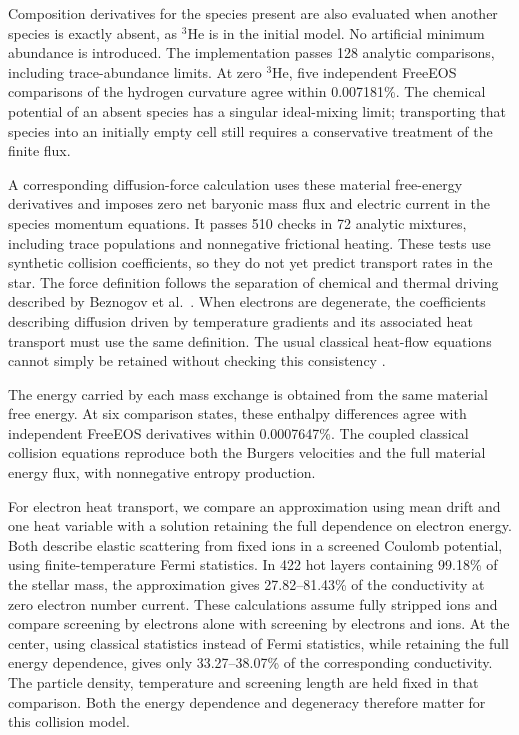 \documentclass[11pt,letterpaper]{article}
\begin{document}
Composition derivatives for the species present are also evaluated when
another species is exactly absent, as $^3$He is in the initial model.
No artificial minimum abundance is introduced. The implementation passes
128 analytic comparisons, including trace-abundance limits. At zero $^3$He,
five independent FreeEOS comparisons of the hydrogen curvature agree within
0.007181\%. The chemical potential of an absent species has a singular
ideal-mixing limit; transporting that species into an initially empty cell
still requires a conservative treatment of the finite flux.

A corresponding diffusion-force calculation uses these material free-energy
derivatives and imposes zero net baryonic mass flux and electric current in
the species momentum equations. It passes 510 checks in 72 analytic mixtures,
including trace populations and nonnegative frictional heating. These tests
use synthetic collision coefficients, so they do not yet predict transport
rates in the star. The force definition follows the separation of chemical
and thermal driving described by Beznogov et al.\ \cite{beznogov16}.
When electrons are degenerate, the coefficients describing diffusion driven
by temperature gradients and its associated heat transport must use the
same definition. The usual classical heat-flow equations cannot simply be
retained without checking this consistency \cite{paxton18}.

The energy carried by each mass exchange is obtained from the same material
free energy. At six comparison states, these enthalpy differences agree with
independent FreeEOS derivatives within 0.0007647\%. The coupled classical
collision equations reproduce both the Burgers velocities and the full
material energy flux, with nonnegative entropy production.

For electron heat transport, we compare an approximation using mean drift
and one heat variable with a solution retaining the full dependence on
electron energy. Both describe elastic scattering from fixed ions in a
screened Coulomb potential, using finite-temperature Fermi statistics.
In 422 hot layers containing 99.18\% of the stellar mass, the approximation
gives 27.82--81.43\% of the conductivity at zero electron number current.
These calculations assume fully stripped ions and compare screening by
electrons alone with screening by electrons and ions. At the center, using
classical statistics instead of Fermi statistics, while retaining the full
energy dependence, gives only 33.27--38.07\% of the corresponding conductivity.
The particle density, temperature and screening length are held fixed in
that comparison. Both the energy dependence and degeneracy therefore matter
for this collision model.
\end{document}
